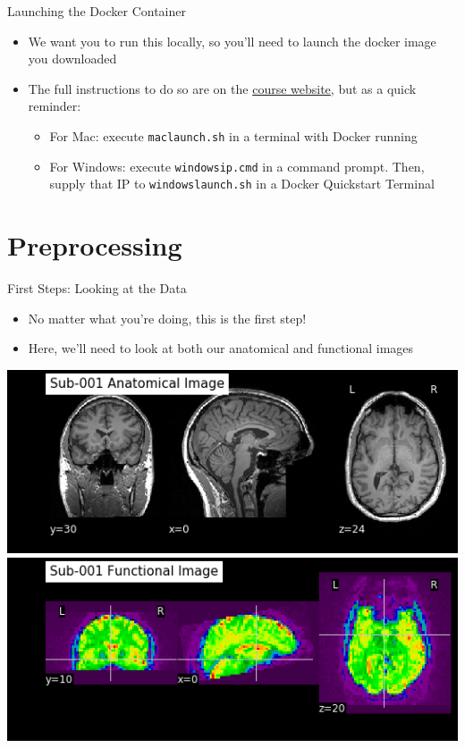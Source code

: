 \documentclass[t,12pt]{beamer}
\begin{document}
\begin{frame}{Launching the Docker Container}
\vspace{10pt}
\begin{itemize}
\setlength\itemsep{1em}
\item We want you to run this locally, so you'll need to launch the docker image you downloaded
\item The full instructions to do so are on the \href{https://emdupre.github.io/hd4630_workshops/categories}{course website}, but as a quick reminder:
\vspace{4pt}
\begin{itemize}
\setlength\itemsep{0.5em}
\item For Mac: execute \texttt{mac\textunderscore{}launch.sh} in a terminal with Docker running
\item For Windows: execute \texttt{windows\textunderscore{}ip.cmd} in a command prompt. Then, supply that IP to \texttt{windows\textunderscore{}launch.sh} in a Docker Quickstart Terminal
\end{itemize}
\end{itemize}
\end{frame}

\section{Preprocessing}
\begin{frame}{First Steps: Looking at the Data}
\vspace{10pt}
\begin{itemize}
\setlength\itemsep{1em}
\item No matter what you're doing, this is the first step! 
\item Here, we'll need to look at both our anatomical and functional images
\end{itemize}
\vspace{4pt}
\centering
\includegraphics[width=.6\textwidth]{images/sub-001_anat_image.png} \\
\vspace{4pt}
\includegraphics[width=.6\textwidth]{images/sub-001_func_image.png} \\
\end{frame}
\end{document}
